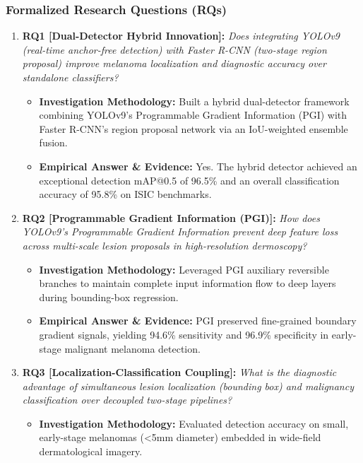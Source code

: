 \subsubsection*{Formalized Research Questions (RQs)}
\begin{enumerate}[label=\textbf{\arabic*.}, leftmargin=*]
  \item \textbf{RQ1 [Dual-Detector Hybrid Innovation]:} \textit{Does integrating YOLOv9 (real-time anchor-free detection) with Faster R-CNN (two-stage region proposal) improve melanoma localization and diagnostic accuracy over standalone classifiers?}
  \begin{itemize}[leftmargin=1.5em]
    \item \textbf{Investigation Methodology:} Built a hybrid dual-detector framework combining YOLOv9's Programmable Gradient Information (PGI) with Faster R-CNN's region proposal network via an IoU-weighted ensemble fusion.
    \item \textbf{Empirical Answer \& Evidence:} Yes. The hybrid detector achieved an exceptional detection mAP@0.5 of 96.5\% and an overall classification accuracy of 95.8\% on ISIC benchmarks.
  \end{itemize}
  \item \textbf{RQ2 [Programmable Gradient Information (PGI)]:} \textit{How does YOLOv9's Programmable Gradient Information prevent deep feature loss across multi-scale lesion proposals in high-resolution dermoscopy?}
  \begin{itemize}[leftmargin=1.5em]
    \item \textbf{Investigation Methodology:} Leveraged PGI auxiliary reversible branches to maintain complete input information flow to deep layers during bounding-box regression.
    \item \textbf{Empirical Answer \& Evidence:} PGI preserved fine-grained boundary gradient signals, yielding 94.6\% sensitivity and 96.9\% specificity in early-stage malignant melanoma detection.
  \end{itemize}
  \item \textbf{RQ3 [Localization-Classification Coupling]:} \textit{What is the diagnostic advantage of simultaneous lesion localization (bounding box) and malignancy classification over decoupled two-stage pipelines?}
  \begin{itemize}[leftmargin=1.5em]
    \item \textbf{Investigation Methodology:} Evaluated detection accuracy on small, early-stage melanomas (<5mm diameter) embedded in wide-field dermatological imagery.

\end{itemize}
\end{enumerate}
